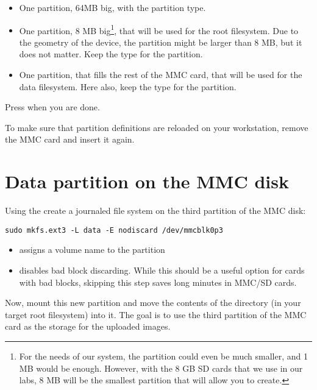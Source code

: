 \begin{itemize}

\item One partition, 64MB big, with the  partition type.

\item One partition, 8 MB big\footnote{For the needs of our system,
  the partition could even be much smaller, and 1 MB would be enough.
  However, with the 8 GB SD cards that we use in our labs, 8 MB will
  be the smallest partition that  will allow you to
  create.}, that will be used for the root filesystem. Due to the
  geometry of the device, the partition might be larger than 8 MB,
  but it does not matter. Keep the  type for the
  partition.

\item One partition, that fills the rest of the MMC card, that will be
  used for the data filesystem. Here also, keep the  type
  for the partition.

\end{itemize}

Press  when you are done.

To make sure that partition definitions are reloaded on your
workstation, remove the MMC card and insert it again.

\section{Data partition on the MMC disk}

Using the  create a journaled file system on the
third partition of the MMC disk:

\begin{verbatim}
sudo mkfs.ext3 -L data -E nodiscard /dev/mmcblk0p3
\end{verbatim}

\begin{itemize}
\item {} assigns a volume name to the partition
\item {} disables bad block discarding. While this
      should be a useful option for cards with bad blocks, skipping
      this step saves long minutes in MMC/SD cards. 
\end{itemize}

Now, mount this new partition and move the contents of the
 directory (in your target root filesystem) into
it. The goal is to use the third partition of the MMC card as the storage
for the uploaded images.

